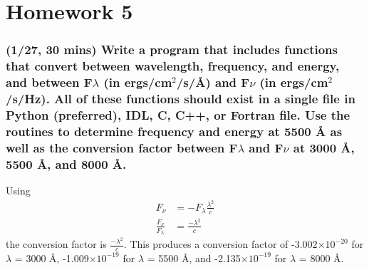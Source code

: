\documentclass[12pt]{article}
\begin{document}
\section*{Homework 5}
\subsubsection{(1/27, 30 mins) Write a program that includes functions
that convert between wavelength, frequency, and energy, and between
F$\scriptstyle \lambda$ (in ergs/cm$^2$/s/\AA{}) and F$\scriptstyle \nu$
(in ergs/cm$^2$/s/Hz). All of these functions should exist in a single
file in Python (preferred), IDL, C, C++, or Fortran file. Use the
routines to determine frequency and energy at 5500 \AA{} as well as the
conversion factor between F$\scriptstyle \lambda$ and F$\scriptstyle
\nu$ at 3000 \AA{}, 5500 \AA{}, and 8000 \AA{}. }

Using
\begin{align*}
    F_{\nu} &= -F_{\lambda}\frac{\lambda^2}{c} \\
    \frac{F_{\nu}}{F_{\lambda}} &= \frac{-\lambda^2}{c}
\end{align*}
the conversion factor is $\frac{-\lambda^2}{c}$. This produces a
conversion factor of
-3.002$\times10^{-20}$ for $\lambda$ = 3000 \AA{},
-1.009$\times10^{-19}$ for $\lambda$ = 5500 \AA{}, and
-2.135$\times10^{-19}$ for $\lambda$ = 8000 \AA{}.
\end{document}
